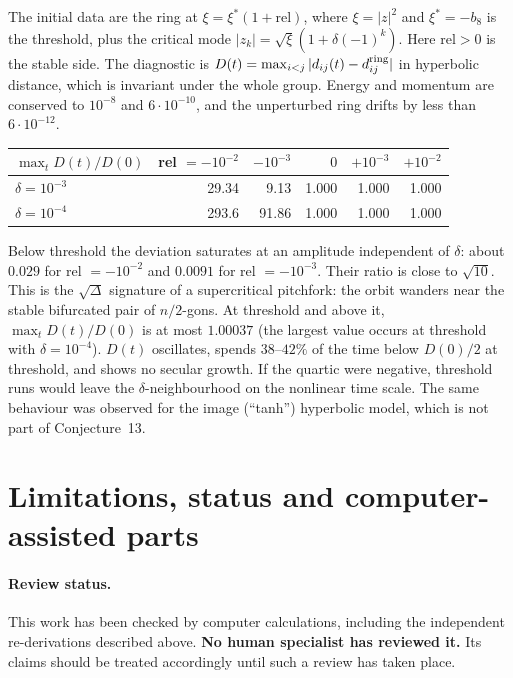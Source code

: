 \documentclass[11pt]{article}
\theoremstyle{definition}
\theoremstyle{remark}
\begin{document}
The initial data are the ring at $\xi=\xi^*(1+\mathrm{rel})$, where $\xi=|z|^2$ and $\xi^*=-b_8$ is the
threshold, plus the critical mode $|z_k|=\sqrt\xi(1+\delta(-1)^k)$. Here $\mathrm{rel}>0$ is the stable
side. The diagnostic is $D(t)=\max_{i<j}|d_{ij}(t)-d_{ij}^{\rm ring}|$ in hyperbolic distance, which is
invariant under the whole group. Energy and momentum are conserved to $10^{-8}$ and $6\cdot10^{-10}$, and the
unperturbed ring drifts by less than $6\cdot10^{-12}$.

\begin{center}\small
\begin{tabular}{lrrrrr}
\toprule
$\max_tD(t)/D(0)$ & rel $=-10^{-2}$ & $-10^{-3}$ & $0$ & $+10^{-3}$ & $+10^{-2}$\\
\midrule
$\delta=10^{-3}$ & 29.34 & 9.13 & 1.000 & 1.000 & 1.000\\
$\delta=10^{-4}$ & 293.6 & 91.86 & 1.000 & 1.000 & 1.000\\
\bottomrule
\end{tabular}
\end{center}

Below threshold the deviation saturates at an amplitude independent of $\delta$: about $0.029$ for
rel $=-10^{-2}$ and $0.0091$ for rel $=-10^{-3}$. Their ratio is close to $\sqrt{10}$. This is the
$\sqrt{\Delta}$ signature of a supercritical pitchfork: the orbit wanders near the stable bifurcated pair of
$n/2$-gons. At threshold and above it, $\max_tD(t)/D(0)$ is at most $1.00037$ (the largest value occurs at
threshold with $\delta=10^{-4}$). $D(t)$ oscillates, spends $38$--$42\%$ of
the time below $D(0)/2$ at threshold, and shows no secular growth. If the quartic were negative, threshold
runs would leave the $\delta$-neighbourhood on the nonlinear time scale. The same behaviour was observed for
the image (``tanh'') hyperbolic model, which is not part of Conjecture~13.

\section{Limitations, status and computer-assisted parts}\label{sec:limits}

\paragraph{Review status.} This work has been checked by computer calculations, including the
independent re-derivations described above. \textbf{No human specialist has
reviewed it.} Its claims should be treated accordingly until such a review has taken place.
\end{document}

